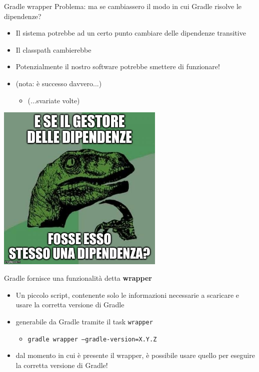 \documentclass[xcolor=dvipsnames,presentation]{beamer}
\begin{document}
\begin{frame}[allowframebreaks]{Gradle wrapper}
    Problema: ma se cambiassero il modo in cui Gradle risolve le dipendenze?
    \begin{itemize}
        \item Il sistema potrebbe ad un certo punto cambiare delle dipendenze transitive
        \item Il classpath cambierebbe
        \item Potenzialmente il nostro software potrebbe smettere di funzionare!
        \item (nota: è successo davvero...)
        \begin{itemize}
            \item (...svariate volte)
        \end{itemize}
    \end{itemize}
    \begin{center}
        \includegraphics[width=0.6\textwidth]{img/philosoraptor}
    \end{center}
    Gradle fornisce una funzionalità detta \textbf{wrapper}
    \begin{itemize}
        \item Un piccolo script, contenente solo le informazioni necessarie a scaricare e usare la corretta versione di Gradle
        \item generabile da Gradle tramite il task \texttt{wrapper}
        \begin{itemize}
            \item \texttt{gradle wrapper --gradle-version=X.Y.Z}
        \end{itemize}
        \item dal momento in cui è presente il wrapper, è possibile usare quello per eseguire la corretta versione di Gradle!

\end{itemize}
\end{frame}
\end{document}
